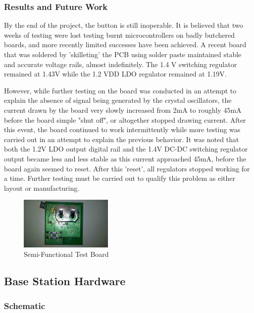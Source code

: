 \documentclass[journal,compsoc]{IEEEtran}
\begin{document}
\subsubsection{Results and Future Work}

By the end of the project, the button is still inoperable. It is believed that two weeks of testing were lost testing burnt microcontrollers on badly butchered boards, and more recently limited successes have been achieved.  A recent board that was soldered by 'skilleting' the PCB using solder paste maintained stable and accurate voltage rails, almost indefinitely. The 1.4 V switching regulator remained at 1.43V while the 1.2 VDD LDO regulator remained at 1.19V.

However, while further testing on the board was conducted in an attempt to explain the absence of signal being generated by the crystal oscillators, the current drawn by the board very slowly increased from 2mA to roughly 45mA before the board simple "shut off", or altogether stopped drawing current. After this event, the board continued to work intermittently while more testing was carried out in an attempt to explain the previous behavior. It was noted that both the 1.2V LDO output digital rail and the 1.4V DC-DC switching regulator output became less and less stable as this current approached 45mA, before the board again seemed to reset. After this 'reset', all regulators stopped working for a time.  Further testing must be carried out to qualify this problem as either layout or manufacturing.

\begin{figure}[H]
\centering
\includegraphics[width=0.4\textwidth]{moose2.jpg}
\caption{Semi-Functional Test Board}
\label{butttest}
\end{figure}

\subsection{Base Station Hardware}

\subsubsection{Schematic}
\end{document}
